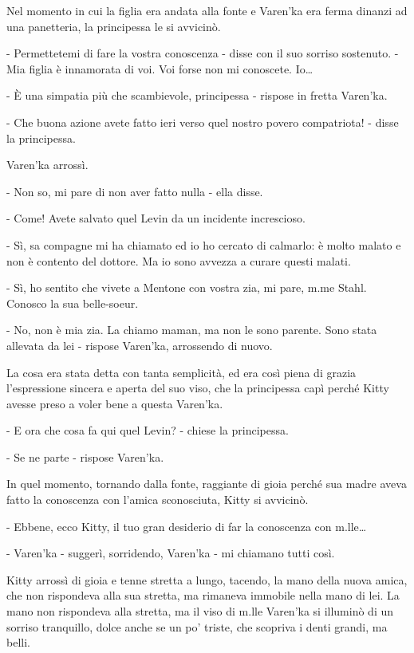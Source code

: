 Nel momento in cui la figlia era andata alla fonte e Varen'ka era ferma dinanzi ad una panetteria, la principessa le si avvicinò. 

- Permettetemi di fare la vostra conoscenza - disse con il suo sorriso sostenuto. - Mia figlia è innamorata di voi. Voi forse non mi conoscete. Io\ldots{} 

- È una simpatia più che scambievole, principessa - rispose in fretta Varen'ka. 

- Che buona azione avete fatto ieri verso quel nostro povero compatriota! - disse la principessa. 

Varen'ka arrossì. 

- Non so, mi pare di non aver fatto nulla - ella disse. 

- Come! Avete salvato quel Levin da un incidente increscioso. 

- Sì, sa compagne mi ha chiamato ed io ho cercato di calmarlo: è molto malato e non è contento del dottore. Ma io sono avvezza a curare questi malati. 

- Sì, ho sentito che vivete a Mentone con vostra zia, mi pare, m.me Stahl. Conosco la sua belle-soeur. 

- No, non è mia zia. La chiamo maman, ma non le sono parente. Sono stata allevata da lei - rispose Varen'ka, arrossendo di nuovo. 

La cosa era stata detta con tanta semplicità, ed era così piena di grazia l'espressione sincera e aperta del suo viso, che la principessa capì perché Kitty avesse preso a voler bene a questa Varen'ka. 

- E ora che cosa fa qui quel Levin? - chiese la principessa. 

- Se ne parte - rispose Varen'ka. 

In quel momento, tornando dalla fonte, raggiante di gioia perché sua madre aveva fatto la conoscenza con l'amica sconosciuta, Kitty si avvicinò. 

- Ebbene, ecco Kitty, il tuo gran desiderio di far la conoscenza con m.lle\ldots{} 

- Varen'ka - suggerì, sorridendo, Varen'ka - mi chiamano tutti così. 

Kitty arrossì di gioia e tenne stretta a lungo, tacendo, la mano della nuova amica, che non rispondeva alla sua stretta, ma rimaneva immobile nella mano di lei. La mano non rispondeva alla stretta, ma il viso di m.lle Varen'ka si illuminò di un sorriso tranquillo, dolce anche se un po' triste, che scopriva i denti grandi, ma belli. 

